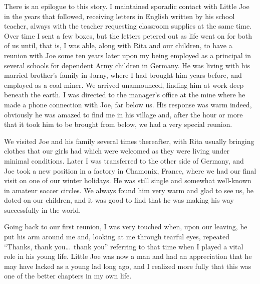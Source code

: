 \documentclass[../m3y]{subfiles}
\begin{document}
There is an epilogue to this story. I maintained sporadic contact with Little Joe in the years that followed, receiving letters in English written by his school teacher, always with the teacher requesting classroom supplies at the same time. Over time I sent a few boxes, but the letters petered out as life went on for both of us until, that is, I was able, along with Rita and our children, to have a reunion with Joe some ten years later upon my being employed as a principal in several schools for dependent Army children in Germany. He was living with his married brother's family in Jarny, where I had brought him years before, and employed as a coal miner. We arrived unannounced, finding him at work deep beneath the earth. I was directed to the manager's office at the mine where he made a phone connection with Joe, far below us. His response was warm indeed, obviously he was amazed to find me in his village and, after the hour or more that it took him to be brought from below, we had a very special reunion.

We visited Joe and his family several times thereafter, with Rita usually bringing clothes that our girls had which were welcomed as they were living under minimal conditions. Later I was transferred to the other side of Germany, and Joe took a new position in a factory in Chamonix, France, where we had our final visit on one of our winter holidays. He was still single and somewhat well-known in amateur soccer circles. We always found him very warm and glad to see us, he doted on our children, and it was good to find that he was making his way successfully in the world.

Going back to our first reunion, I was very touched when, upon our leaving, he put his arm around me and, looking at me through tearful eyes, repeated ``Thanks, thank you\ldots\ thank you'' referring to that time when I played a vital role in his young life. Little Joe was now a man and had an appreciation that he may have lacked as a young lad long ago, and I realized more fully that this was one of the better chapters in my own life.
\end{document}
